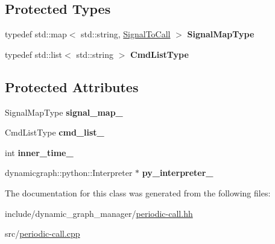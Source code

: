 \subsection*{Protected Types}
\begin{DoxyCompactItemize}
\item 
typedef std\+::map$<$ std\+::string, \hyperlink{structdynamic__graph_1_1PeriodicCall_1_1SignalToCall}{Signal\+To\+Call} $>$ {\bfseries Signal\+Map\+Type}\hypertarget{classdynamic__graph_1_1PeriodicCall_acf4cd14a78523d6612d4679cb5a67d8b}{}\label{classdynamic__graph_1_1PeriodicCall_acf4cd14a78523d6612d4679cb5a67d8b}

\item 
typedef std\+::list$<$ std\+::string $>$ {\bfseries Cmd\+List\+Type}\hypertarget{classdynamic__graph_1_1PeriodicCall_a9f1b6479e369706876d3f9a145b4f621}{}\label{classdynamic__graph_1_1PeriodicCall_a9f1b6479e369706876d3f9a145b4f621}

\end{DoxyCompactItemize}
\subsection*{Protected Attributes}
\begin{DoxyCompactItemize}
\item 
Signal\+Map\+Type {\bfseries signal\+\_\+map\+\_\+}\hypertarget{classdynamic__graph_1_1PeriodicCall_a6f63edf8adc5323c4e2b5dbe5bec1fb1}{}\label{classdynamic__graph_1_1PeriodicCall_a6f63edf8adc5323c4e2b5dbe5bec1fb1}

\item 
Cmd\+List\+Type {\bfseries cmd\+\_\+list\+\_\+}\hypertarget{classdynamic__graph_1_1PeriodicCall_a7d82343533f1913b1950589da0a6e70a}{}\label{classdynamic__graph_1_1PeriodicCall_a7d82343533f1913b1950589da0a6e70a}

\item 
int {\bfseries inner\+\_\+time\+\_\+}\hypertarget{classdynamic__graph_1_1PeriodicCall_a5a7e82f4cf00a6a6e1d86521da303b0d}{}\label{classdynamic__graph_1_1PeriodicCall_a5a7e82f4cf00a6a6e1d86521da303b0d}

\item 
dynamicgraph\+::python\+::\+Interpreter $\ast$ {\bfseries py\+\_\+interpreter\+\_\+}\hypertarget{classdynamic__graph_1_1PeriodicCall_a844af38083b3d1aaa8dedbb5ba35ab1f}{}\label{classdynamic__graph_1_1PeriodicCall_a844af38083b3d1aaa8dedbb5ba35ab1f}

\end{DoxyCompactItemize}


The documentation for this class was generated from the following files\+:\begin{DoxyCompactItemize}
\item 
include/dynamic\+\_\+graph\+\_\+manager/\hyperlink{periodic-call_8hh}{periodic-\/call.\+hh}\item 
src/\hyperlink{periodic-call_8cpp}{periodic-\/call.\+cpp}\end{DoxyCompactItemize}
